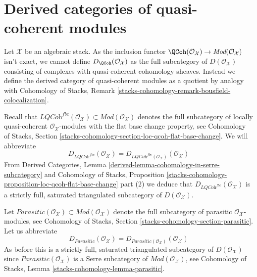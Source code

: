 \section{Derived categories of quasi-coherent modules}
\label{stacks-perfect-section-derived}
Let $\mathcal{X}$ be an algebraic stack. As the inclusion functor
$\QCoh(\mathcal{O}_\mathcal{X}) \to
\textit{Mod}(\mathcal{O}_\mathcal{X})$ isn't exact, we cannot define
$D_\QCoh(\mathcal{O}_\mathcal{X})$ as the full subcategory
of $D(\mathcal{O}_\mathcal{X})$ consisting of complexes with quasi-coherent
cohomology sheaves. Instead we define the derived category of
quasi-coherent modules as a quotient
by analogy with Cohomology of Stacks, Remark
\ref{stacks-cohomology-remark-bousfield-colocalization}.

\medskip\noindent
Recall that $\textit{LQCoh}^{fbc}(\mathcal{O}_\mathcal{X}) \subset
\textit{Mod}(\mathcal{O}_\mathcal{X})$ denotes the full subcategory
of locally quasi-coherent $\mathcal{O}_\mathcal{X}$-modules with the
flat base change property, see Cohomology of Stacks, Section
\ref{stacks-cohomology-section-loc-qcoh-flat-base-change}.
We will abbreviate
$$
D_{\textit{LQCoh}^{fbc}}(\mathcal{O}_\mathcal{X}) =
D_{\textit{LQCoh}^{fbc}(\mathcal{O}_\mathcal{X})}(\mathcal{O}_\mathcal{X})
$$
From
Derived Categories, Lemma \ref{derived-lemma-cohomology-in-serre-subcategory}
and Cohomology of Stacks, Proposition
\ref{stacks-cohomology-proposition-loc-qcoh-flat-base-change} part (2)
we deduce that $D_{\textit{LQCoh}^{fbc}}(\mathcal{O}_\mathcal{X})$
is a strictly full, saturated triangulated subcategory of
$D(\mathcal{O}_\mathcal{X})$.

\medskip\noindent
Let $\textit{Parasitic}(\mathcal{O}_\mathcal{X}) \subset
\textit{Mod}(\mathcal{O}_\mathcal{X})$ denote the full subcategory
of parasitic $\mathcal{O}_\mathcal{X}$-modules, see
Cohomology of Stacks, Section
\ref{stacks-cohomology-section-parasitic}.
Let us abbreviate
$$
D_{\textit{Parasitic}}(\mathcal{O}_\mathcal{X}) =
D_{\textit{Parasitic}(\mathcal{O}_\mathcal{X})}(\mathcal{O}_\mathcal{X})
$$
As before this is a strictly full, saturated triangulated subcategory of
$D(\mathcal{O}_\mathcal{X})$ since
$\textit{Parasitic}(\mathcal{O}_\mathcal{X})$
is a Serre subcategory of $\textit{Mod}(\mathcal{O}_\mathcal{X})$, see
Cohomology of Stacks, Lemma \ref{stacks-cohomology-lemma-parasitic}.

